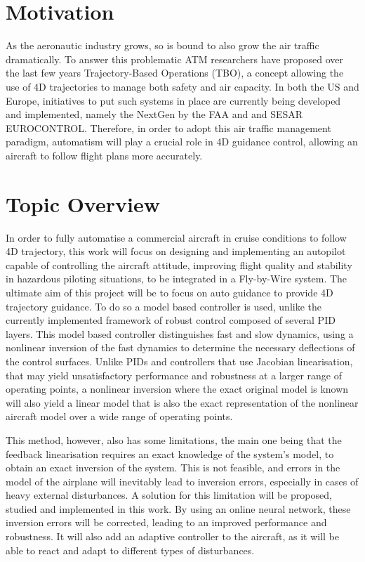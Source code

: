 \section{Motivation}
\label{section:motivation}

As the aeronautic industry grows, so is bound to also grow the air traffic dramatically. To answer this problematic ATM researchers have proposed over the last few years Trajectory-Based Operations (TBO), a concept allowing the use of 4D trajectories to manage both safety and air capacity. In both the US and Europe, initiatives to put such systems in place are currently being developed and implemented, namely the NextGen by the FAA and and SESAR EUROCONTROL. Therefore, in order to adopt this air traffic management paradigm, automatism will play a crucial role in 4D guidance control, allowing an aircraft to follow flight plans more accurately.



\section{Topic Overview}
\label{section:overview}

In order to fully automatise a commercial aircraft in cruise conditions to follow 4D trajectory, this work will focus on designing and implementing an autopilot capable of controlling the aircraft attitude, improving flight quality and stability in hazardous piloting situations, to be integrated in a Fly-by-Wire system. The ultimate aim of this project will be to focus on auto guidance to provide 4D trajectory guidance. To do so a model based controller is used, unlike the currently implemented framework of robust control composed of several PID layers. This model based controller distinguishes fast and slow dynamics, using a nonlinear inversion of the fast dynamics to determine the necessary deflections of the control surfaces. Unlike PIDs and controllers that use Jacobian linearisation, that may yield unsatisfactory performance and robustness at a larger range of operating points, a nonlinear inversion where the exact original model is known will also yield a linear model that is also the exact representation of the nonlinear aircraft model over a wide range of operating points. 

This method, however, also has some limitations, the main one being that the feedback linearisation requires an exact knowledge of the system's model, to obtain an exact inversion of the system. This is not feasible, and errors in the model of the airplane will inevitably lead to inversion errors, especially in cases of heavy external disturbances. A solution for this limitation will be proposed, studied and implemented in this work. By using an online neural network, these inversion errors will be corrected, leading to an improved performance and robustness. It will also add an adaptive controller to the aircraft, as it will be able to react and adapt to different types of disturbances.



